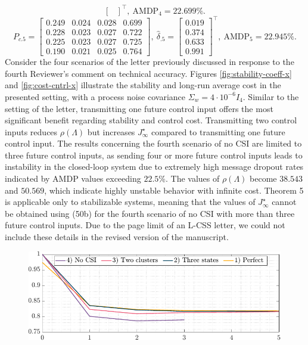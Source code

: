{\begin{equation*}
\begin{bmatrix}
\end{bmatrix}^{\top},~\text{AMDP}_{4} = 22.699\%.
\end{equation*}
\begin{equation*}
    P_{c.5} = 
\begin{bmatrix}
0.249 & 0.024 & 0.028 & 0.699 \\
0.228 & 0.023 & 0.027 & 0.722 \\
0.225 & 0.023 & 0.027 & 0.725 \\
0.190 & 0.021 & 0.025 & 0.764
\end{bmatrix},~
\hat{\delta}_{.5} = 
\begin{bmatrix}
0.019 \\ 0.374 \\ 0.633 \\ 0.991
\end{bmatrix}^{\top},~\text{AMDP}_{5} = 22.945\%.
\end{equation*}
Consider the four scenarios of the letter previously discussed in response to the fourth Reviewer's comment on technical accuracy. 
Figures \ref{fig:stability-coeff-x} and \ref{fig:cost-cntrl-x} illustrate the stability and long-run average cost in the presented setting, with a process noise covariance $\Sigma_w \!=\! 4\cdot 10^{-6} I_4$. Similar to the setting of the letter, transmitting one future control input offers the most significant benefit regarding stability and control cost. Transmitting two control inputs reduces $\rho(\mathit{\Lambda})$ but increases $J_{\infty}^{\star}$ compared to transmitting one future control input. 
The results concerning the fourth scenario of no CSI are limited to three future control inputs, as sending four or more future control inputs leads to instability in the closed-loop system due to extremely high message dropout rates indicated by AMDP values exceeding $22.5$\%. The values of $\rho(\mathit{\Lambda})$ become $38.543$ and $50.569$, which indicate highly unstable behavior with infinite cost. Theorem 5 is applicable only to stabilizable systems, meaning that the values of $J_{\infty}^{\star}$ cannot be obtained using (50b) for the fourth scenario of no CSI with more than three future control inputs. Due to the page limit of an L-CSS letter, we could not include these details in the revised version of the manuscript.
\begin{figure}[h!]
\begin{center}
\includegraphics[width=0.76\columnwidth]{stability-cntrl-x.pdf}

\end{center}
\end{figure}}
